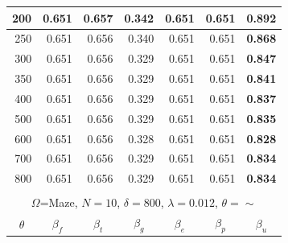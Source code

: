 \documentclass[letterpaper, 10 pt, conference]{ieeeconf}
\begin{document}
\begin{figure}[!h]
\begin{minipage}{\columnwidth}
{\begin{tabular}{|rrrrrrr|}
\multicolumn{1}{|r|}{200} & \multicolumn{1}{r|}{0.651} & \multicolumn{1}{r|}{0.657} & \multicolumn{1}{r|}{0.342} & \multicolumn{1}{r|}{0.651} & \multicolumn{1}{r|}{0.651} & \textbf{0.892} \\ \hline
\multicolumn{1}{|r|}{250} & \multicolumn{1}{r|}{0.651} & \multicolumn{1}{r|}{0.656} & \multicolumn{1}{r|}{0.340} & \multicolumn{1}{r|}{0.651} & \multicolumn{1}{r|}{0.651} & \textbf{0.868} \\ \hline
\multicolumn{1}{|r|}{300} & \multicolumn{1}{r|}{0.651} & \multicolumn{1}{r|}{0.656} & \multicolumn{1}{r|}{0.329} & \multicolumn{1}{r|}{0.651} & \multicolumn{1}{r|}{0.651} & \textbf{0.847} \\ \hline
\multicolumn{1}{|r|}{350} & \multicolumn{1}{r|}{0.651} & \multicolumn{1}{r|}{0.656} & \multicolumn{1}{r|}{0.329} & \multicolumn{1}{r|}{0.651} & \multicolumn{1}{r|}{0.651} & \textbf{0.841} \\ \hline
\multicolumn{1}{|r|}{400} & \multicolumn{1}{r|}{0.651} & \multicolumn{1}{r|}{0.656} & \multicolumn{1}{r|}{0.329} & \multicolumn{1}{r|}{0.651} & \multicolumn{1}{r|}{0.651} & \textbf{0.837} \\ \hline
\multicolumn{1}{|r|}{500} & \multicolumn{1}{r|}{0.651} & \multicolumn{1}{r|}{0.656} & \multicolumn{1}{r|}{0.329} & \multicolumn{1}{r|}{0.651} & \multicolumn{1}{r|}{0.651} & \textbf{0.835} \\ \hline
\multicolumn{1}{|r|}{600} & \multicolumn{1}{r|}{0.651} & \multicolumn{1}{r|}{0.656} & \multicolumn{1}{r|}{0.328} & \multicolumn{1}{r|}{0.651} & \multicolumn{1}{r|}{0.651} & \textbf{0.828} \\ \hline
\multicolumn{1}{|r|}{700} & \multicolumn{1}{r|}{0.651} & \multicolumn{1}{r|}{0.656} & \multicolumn{1}{r|}{0.329} & \multicolumn{1}{r|}{0.651} & \multicolumn{1}{r|}{0.651} & \textbf{0.834} \\ \hline
\multicolumn{1}{|r|}{800} & \multicolumn{1}{r|}{0.651} & \multicolumn{1}{r|}{0.656} & \multicolumn{1}{r|}{0.329} & \multicolumn{1}{r|}{0.651} & \multicolumn{1}{r|}{0.651} & \textbf{0.834} \\ \hline
\multicolumn{7}{|l|}{\cellcolor[HTML]{C0C0C0}} \\ \hline
\multicolumn{7}{|c|}{$\Omega$=Maze,   $N=10$, $\delta=800$, $\lambda=0.012$, $\theta=\sim$} \\ \hline
\multicolumn{1}{|c|}{$\theta$} & \multicolumn{1}{c|}{$\beta_f$} & \multicolumn{1}{c|}{$\beta_t$} & \multicolumn{1}{c|}{$\beta_g$} & \multicolumn{1}{c|}{$\beta_e$} & \multicolumn{1}{c|}{$\beta_p$} & \multicolumn{1}{c|}{$\beta_u$} \\ \hline

\end{tabular}}
\end{minipage}
\end{figure}
\end{document}

